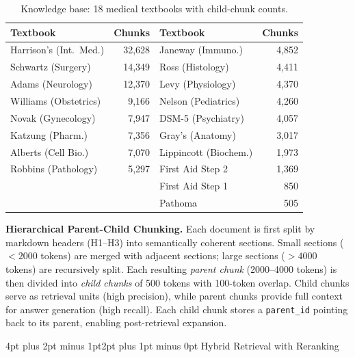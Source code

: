 \documentclass[10pt,twocolumn,letterpaper]{article}
\makeatletter
\renewcommand\subsection{\@startsection{subsection}{2}{\z@}%
  {4pt plus 2pt minus 1pt}{2pt plus 1pt minus 0pt}%
  {\normalsize\bfseries}}
\makeatother
\begin{document}
\begin{table}[h]
\centering
\footnotesize
\setlength{\tabcolsep}{3pt}
\begin{tabular}{lrlr}
\toprule
\textbf{Textbook} & \textbf{Chunks} & \textbf{Textbook} & \textbf{Chunks} \\
\midrule
Harrison's (Int.\ Med.) & 32,628 & Janeway (Immuno.) & 4,852 \\
Schwartz (Surgery) & 14,349 & Ross (Histology) & 4,411 \\
Adams (Neurology) & 12,370 & Levy (Physiology) & 4,370 \\
Williams (Obstetrics) & 9,166 & Nelson (Pediatrics) & 4,260 \\
Novak (Gynecology) & 7,947 & DSM-5 (Psychiatry) & 4,057 \\
Katzung (Pharm.) & 7,356 & Gray's (Anatomy) & 3,017 \\
Alberts (Cell Bio.) & 7,070 & Lippincott (Biochem.) & 1,973 \\
Robbins (Pathology) & 5,297 & First Aid Step 2 & 1,369 \\
& & First Aid Step 1 & 850 \\
& & Pathoma & 505 \\
\bottomrule
\end{tabular}
\vspace{2pt}
\caption{Knowledge base: 18 medical textbooks with child-chunk counts.}
\label{tab:textbooks}
\end{table}

\textbf{Hierarchical Parent-Child Chunking.} Each document is first split by markdown headers (H1--H3) into semantically coherent sections. Small sections ($<2000$ tokens) are merged with adjacent sections; large sections ($>4000$ tokens) are recursively split. Each resulting \textit{parent chunk} (2000--4000 tokens) is then divided into \textit{child chunks} of 500 tokens with 100-token overlap. Child chunks serve as retrieval units (high precision), while parent chunks provide full context for answer generation (high recall). Each child chunk stores a \texttt{parent\_id} pointing back to its parent, enabling post-retrieval expansion.

\subsection{Hybrid Retrieval with Reranking}
\end{document}
